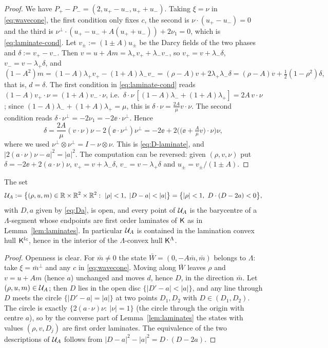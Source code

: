 \begin{proof}
We have $P_+-P_-=(2,u_+-u_-,u_++u_-)$. Taking $\xi=\nu$ in \eqref{eq:wavecone}, the first condition only fixes $c$, the second is $\nu\cdot(u_+-u_-)=0$ and the third is
$\nu^\perp\cdot(u_+-u_-+A(u_++u_-))+2\nu_1=0$, which is \eqref{eq:laminate-cond}. Let $v_\pm:=(1\pm A)u_\pm$ be the Darcy fields of the two phases and $\delta:=v_+-v_-$. Then
$v=u+Am=\lambda_+v_++\lambda_-v_-$, so $v_+=v+\lambda_-\delta$, $v_-=v-\lambda_+\delta$, and
\[
(1-A^2)m=(1-A)\lambda_+v_+-(1+A)\lambda_-v_-=(\rho-A)v+2\lambda_+\lambda_-\delta=(\rho-A)v+\tfrac12(1-\rho^2)\delta,
\]
that is, $d=\delta$. The first condition in \eqref{eq:laminate-cond} reads $(1-A)v_+\cdot\nu=(1+A)v_-\cdot\nu$, i.e.\ $\delta\cdot\nu\,[(1-A)\lambda_-+(1+A)\lambda_+]=2A\,v\cdot\nu$; since
$(1-A)\lambda_-+(1+A)\lambda_+=\mu$, this is $\delta\cdot\nu=\frac{2A}{\mu}v\cdot\nu$. The second condition reads $\delta\cdot\nu^\perp=-2\nu_1=-2\ee\cdot\nu^\perp$. Hence
\[
\delta=\frac{2A}{\mu}(v\cdot\nu)\nu-2(\ee\cdot\nu^\perp)\nu^\perp=-2\ee+2\Big(\big(\ee+\tfrac A\mu v\big)\cdot\nu\Big)\nu,
\]
where we used $\nu^\perp\otimes\nu^\perp=I-\nu\otimes\nu$. This is \eqref{eq:D-laminate}, and $|2(a\cdot\nu)\nu-a|^2=|a|^2$. The computation can be reversed: given $(\rho,v,\nu)$ put
$\delta=-2\ee+2(a\cdot\nu)\nu$, $v_+=v+\lambda_-\delta$, $v_-=v-\lambda_+\delta$ and $u_\pm=v_\pm/(1\pm A)$.
\end{proof}

\begin{proposition}\label{prop:hull}
The set
\[
\Uc_A:=\big\{(\rho,u,m)\in\R\times\R^2\times\R^2:\ |\rho|<1,\ |D-a|<|a|\big\}=\big\{|\rho|<1,\ D\cdot(D-2a)<0\big\},
\]
with $D,a$ given by \eqref{eq:Da}, is open, and every point of $\mathcal{U}_A$ is the barycentre of a $\Lambda$-segment whose endpoints are first order laminates of $\mathsf{K}$ as in Lemma~\ref{lem:laminates}.
In particular $\mathcal{U}_A$ is contained in the lamination convex hull $\mathsf{K}^{lc}$, hence in the interior of the $\Lambda$-convex hull $\mathsf{K}^\Lambda$.
\end{proposition}

\begin{proof}
Openness is clear. For $\bar m\ne0$ the state $\bar W=(0,-A\bar m,\bar m)$ belongs to $\Lambda$: take $\xi=\bar m^\perp$ and any $c$ in \eqref{eq:wavecone}. Moving along $\bar W$ leaves $\rho$ and
$v=u+Am$ (hence $a$) unchanged and moves $d$, hence $D$, in the direction $\bar m$. Let $(\rho,u,m)\in\mathcal{U}_A$; then $D$ lies in the open disc $\{|D'-a|<|a|\}$, and any line through $D$ meets the circle
$\{|D'-a|=|a|\}$ at two points $D_1,D_2$ with $D\in(D_1,D_2)$. The circle is exactly $\{2(a\cdot\nu)\nu:\ |\nu|=1\}$ (the circle through the origin with centre $a$), so by the converse part of
Lemma~\ref{lem:laminates} the states with values $(\rho,v,D_j)$ are first order laminates. The equivalence of the two descriptions of $\mathcal{U}_A$ follows from $|D-a|^2-|a|^2=D\cdot(D-2a)$.
\end{proof}

